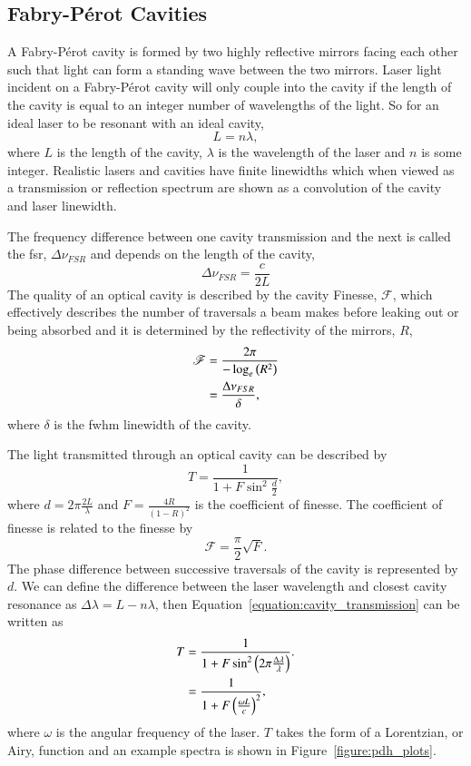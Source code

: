\subsection{Fabry-P\'erot Cavities}\label{section:cavity_theory}
A Fabry-P\'erot cavity is formed by two highly reflective mirrors facing each other such that light can form a standing wave between the two mirrors.
Laser light incident on a Fabry-P\'erot cavity will only couple into the cavity if the length of the cavity is equal to an integer number of wavelengths of the light.
So for an ideal laser to be resonant with an ideal cavity,
\begin{equation}
L = n \lambda,
\end{equation}
where $L$ is the length of the cavity, $\lambda$ is the wavelength of the laser and $n$ is some integer.
Realistic lasers and cavities have finite linewidths which when viewed as a transmission or reflection spectrum are shown as a convolution of the cavity and laser linewidth.

The frequency difference between one cavity transmission and the next is called the \gls{fsr}, $\Delta \nu_{FSR}$ and depends on the length of the cavity,
\begin{equation}
\Delta \nu_{FSR} = \frac{c}{2L}
\end{equation}
The quality of an optical cavity is described by the cavity Finesse, $\mathscr{F}$, which effectively describes the number of traversals a beam makes before leaking out or being absorbed and it is determined by the reflectivity of the mirrors, $R$,
\begin{align}
\mathscr{F} &= \frac{2\pi}{-\log_e\left(R^2\right)} \notag\\
 &= \frac{\Delta \nu_{FSR}}{\delta},
\end{align}
where $\delta$ is the \gls{fwhm} linewidth of the cavity.

The light transmitted through an optical cavity can be described by~\cite{pedrotti_introduction_2007}
\begin{equation}\label{equation:cavity_transmission}
T = \frac{1}{1+F\sin^2\frac{d}{2}},
\end{equation}
where $d=2\pi\frac{2L}{\lambda}$ and $F=\frac{4R}{\left(1-R\right)^2}$ is the coefficient of finesse.
The coefficient of finesse is related to the finesse by
\begin{equation}
\mathscr{F}=\frac{\pi}{2}\sqrt{F}.
\end{equation}
The phase difference between successive traversals of the cavity is represented by $d$.
We can define the difference between the laser wavelength and closest cavity resonance as $\Delta\lambda=L-n\lambda$, then Equation~\ref{equation:cavity_transmission} can be written as
\begin{align}\label{equation:cavity_transmission2}
T &= \frac{1}{1+F\sin^2\left(2\pi\frac{\Delta\lambda}{\lambda}\right)}. \notag \\
&= \frac{1}{1+F\left(\frac{\omega L}{c}\right)^2},
\end{align}
where $\omega$ is the angular frequency of the laser.
$T$ takes the form of a Lorentzian, or Airy, function and an example spectra is shown in Figure~\ref{figure:pdh_plots}.

